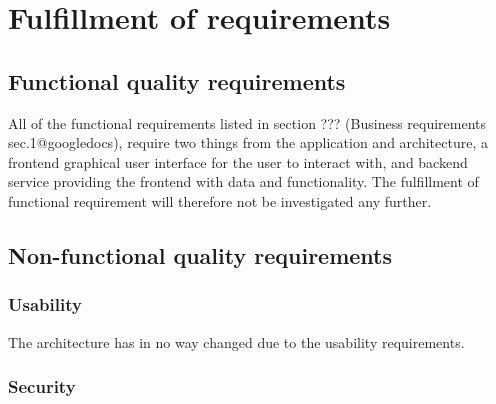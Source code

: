 \section{Fulfillment of requirements}

\subsection{Functional quality requirements}
All of the functional requirements listed in section ??? (Business requirements sec.1@googledocs), require two things from the application and architecture, a frontend graphical user interface for the user to interact with, and backend service providing the frontend with data and functionality. The fulfillment of functional requirement will therefore not be investigated any further.

\subsection{Non-functional quality requirements}

\subsubsection{Usability}
The architecture has in no way changed due to the usability requirements. 

\subsubsection{Security}

